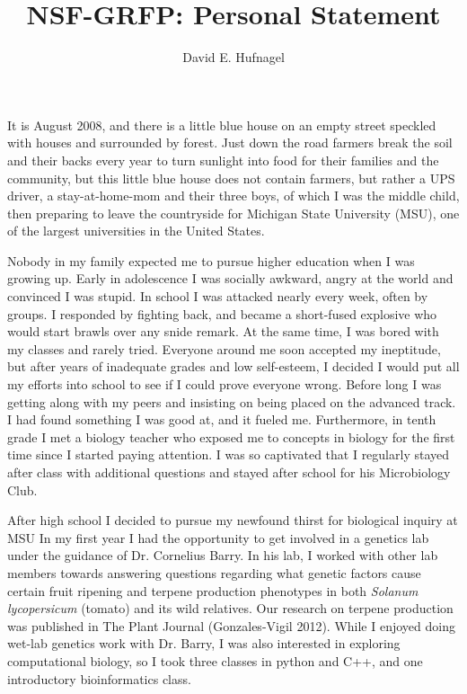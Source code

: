 \documentclass[12pt]{amsart}
\title{NSF-GRFP: Personal Statement}
\author{David E. Hufnagel}
\begin{document}
\maketitle
It is August 2008, and there is a little blue house on an empty street speckled with houses and surrounded by forest. 
Just down the road farmers break the soil and their backs every year to turn sunlight into food for their families and the community, but this little blue house does not contain farmers, but rather a UPS driver, a stay-at-home-mom and their three boys, of which I was the middle child, then preparing to leave the countryside for Michigan State University (MSU), one of the largest universities in the United States.

Nobody in my family expected me to pursue higher education when I was growing up.  
Early in adolescence I was socially awkward, angry at the world and convinced I was stupid.  
In school I was attacked nearly every week, often by groups.  
I responded by fighting back, and became a short-fused explosive who would start brawls over any snide remark.
At the same time, I was bored with my classes and rarely tried.  
Everyone around me soon accepted my ineptitude, but after years of inadequate grades and low self-esteem, I decided I would put all my efforts into school to see if I could prove everyone wrong.  
Before long I was getting along with my peers and insisting on being placed on the advanced track.  
I had found something I was good at, and it fueled me.  
Furthermore, in tenth grade I met a biology teacher who exposed me to concepts in biology for the first time since I started paying attention.  
I was so captivated that I regularly stayed after class with additional questions and stayed after school for his Microbiology Club.  

After high school I decided to pursue my newfound thirst for biological inquiry at MSU
In my first year I had the opportunity to get involved in a genetics lab under the guidance of Dr. Cornelius Barry. 
In his lab, I worked with other lab members towards answering questions regarding what genetic factors cause certain fruit ripening and terpene production phenotypes in both  \textit{Solanum lycopersicum} (tomato) and its wild relatives.  
Our research on terpene production was published in The Plant Journal (Gonzales-Vigil 2012).  
While I enjoyed doing wet-lab genetics work with Dr. Barry, I was also interested in exploring computational biology, so I took three classes in python and C++, and one introductory bioinformatics class.
\end{document}
